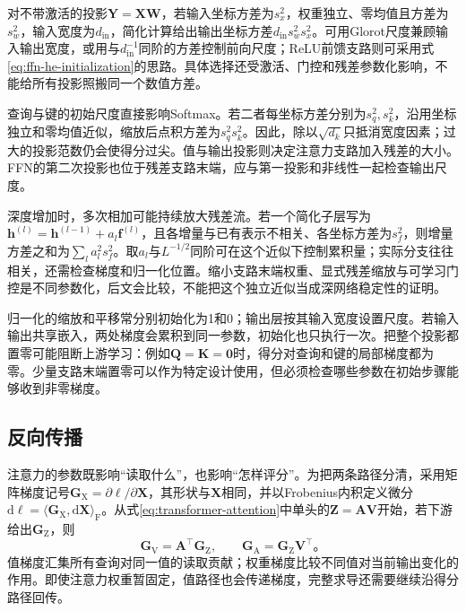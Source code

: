 对不带激活的投影$\bm Y=\bm X\bm W$，若输入坐标方差为$s_x^2$，权重独立、零均值且方差为$s_w^2$，输入宽度为$d_{\mathrm{in}}$，简化计算给出输出坐标方差$d_{\mathrm{in}}s_w^2s_x^2$。可用Glorot尺度兼顾输入输出宽度，或用与$d_{\mathrm{in}}^{-1}$同阶的方差控制前向尺度；ReLU前馈支路则可采用式\eqref{eq:ffn-he-initialization}的思路。具体选择还受激活、门控和残差参数化影响，不能给所有投影照搬同一个数值方差。

查询与键的初始尺度直接影响Softmax。若二者每坐标方差分别为$s_q^2,s_k^2$，沿用坐标独立和零均值近似，缩放后点积方差为$s_q^2s_k^2$。因此，除以$\sqrt{d_k}$只抵消宽度因素；过大的投影范数仍会使得分过尖。值与输出投影则决定注意力支路加入残差的大小。FFN的第二次投影也位于残差支路末端，应与第一投影和非线性一起检查输出尺度。

深度增加时，多次相加可能持续放大残差流。若一个简化子层写为$\bm h^{(l)}=\bm h^{(l-1)}+a_l\bm f^{(l)}$，且各增量与已有表示不相关、各坐标方差为$s_f^2$，则增量方差之和为$\sum_l a_l^2s_f^2$。取$a_l$与$L^{-1/2}$同阶可在这个近似下控制累积量；实际分支往往相关，还需检查梯度和归一化位置。缩小支路末端权重、显式残差缩放与可学习门控是不同参数化，后文会比较，不能把这个独立近似当成深网络稳定性的证明。

归一化的缩放和平移常分别初始化为1和0；输出层按其输入宽度设置尺度。若输入输出共享嵌入，两处梯度会累积到同一参数，初始化也只执行一次。把整个投影都置零可能阻断上游学习：例如$\bm Q=\bm K=\bm0$时，得分对查询和键的局部梯度都为零。少量支路末端置零可以作为特定设计使用，但必须检查哪些参数在初始步骤能够收到非零梯度。

\subsection{反向传播}
\label{sec:transformer-backpropagation}

注意力的参数既影响“读取什么”，也影响“怎样评分”。为把两条路径分清，采用矩阵梯度记号$\bm G_{\mathrm X}=\partial\ell/\partial\bm X$，其形状与$\bm X$相同，并以Frobenius内积定义微分$\mathrm d\ell=\langle\bm G_{\mathrm X},\mathrm d\bm X\rangle_{\mathrm F}$。从式\eqref{eq:transformer-attention}中单头的$\bm Z=\bm A\bm V$开始，若下游给出$\bm G_{\mathrm Z}$，则
\begin{equation}
  \bm G_{\mathrm V}=\bm A^{\top}\bm G_{\mathrm Z},\qquad
  \bm G_{\mathrm A}=\bm G_{\mathrm Z}\bm V^{\top}\text{。}
  \label{eq:transformer-aggregation-gradient}
\end{equation}
值梯度汇集所有查询对同一值的读取贡献；权重梯度比较不同值对当前输出变化的作用。即使注意力权重暂固定，值路径也会传递梯度，完整求导还需要继续沿得分路径回传。

